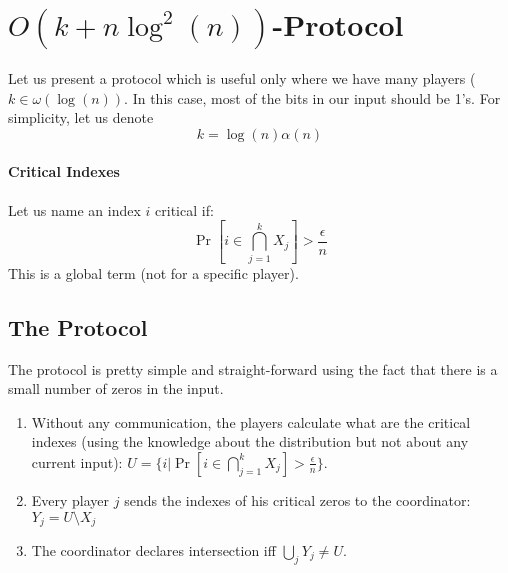 \documentclass{article}
\theoremstyle{plain}
\begin{document}
\section{$O(k + n\log^{2}(n))$-Protocol}
Let us present a protocol which is useful only where we have many players ($k \in \omega(\log(n))$. In this case, most of the bits in our input should be 1's. For simplicity, let us denote
\begin{equation*}
    k = \log(n) \alpha(n)
\end{equation*}
\paragraph{Critical Indexes}
Let us name an index $i$ critical if:
\begin{equation*}
    \Pr[i \in \bigcap^{k}_{j=1}{X_j}] > \frac{\epsilon}{n}
\end{equation*}
This is a global term (not for a specific player).
\subsection{The Protocol}
The protocol is pretty simple and straight-forward using the fact that there is a small number of zeros in the input.
\begin{enumerate}[(1)]
    \item Without any communication, the players calculate what are the critical indexes (using the knowledge about the distribution but not about any current input): $U = \{i | \Pr[i \in \bigcap^{k}_{j=1}{X_j}] > \frac{\epsilon}{n}\}$.
    \item Every player $j$ sends the indexes of his critical zeros to the coordinator: $Y_j= U \setminus X_j$
    \item The coordinator declares intersection iff $\bigcup_j Y_j \neq U$.
\end{enumerate}
\end{document}
